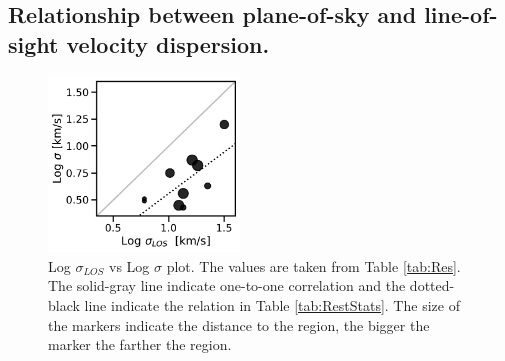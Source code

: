 \documentclass[fleqn,usenatbib, useAMS, a4paper]{mnras}
\begin{document}
\subsection{Relationship between plane-of-sky and line-of-sight velocity dispersion.}




\begin{figure}
\centering 
\includegraphics[width=2in]{Figures/sigmas.pdf}
\caption{Log \(\sigma_{LOS}\) vs Log \(\sigma\) plot. The values are taken from Table \ref{tab:Res}. The solid-gray line indicate one-to-one correlation and the dotted-black line indicate the relation in Table \ref{tab:RestStats}. The size of the markers indicate the distance to the region, the bigger the marker the farther the region. }
\label{fig:sigvssig}
\end{figure}

\end{document}
